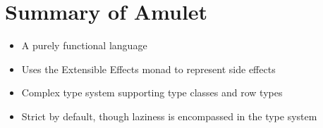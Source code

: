 \section{Summary of Amulet}

\begin{itemize}
\item A purely functional language
\item Uses the Extensible Effects monad\cite{kiselyov2013extensible} to represent side effects
\item Complex type system supporting type classes and row types
\item Strict by default, though laziness is encompassed in the type system
\end{itemize}
